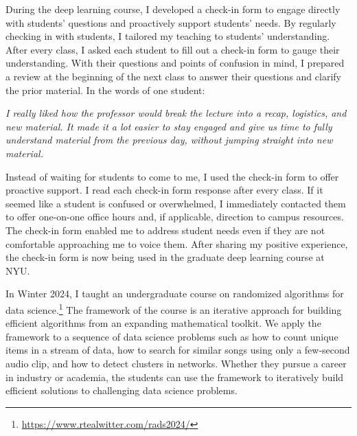 \documentclass[11pt]{article}
\begin{document}
During the deep learning course, I developed a check-in form to engage directly with students' questions and proactively support students' needs.
By regularly checking in with students, I tailored my teaching to students' understanding.
After every class, I asked each student to fill out a check-in form to gauge their understanding.
With their questions and points of confusion in mind, I prepared a review at the beginning of the next class to answer their questions and clarify the prior material.
In the words of one student:
\begin{displayquote}
\textit{
I really liked how the professor would break the lecture into a recap, logistics, and new material. It made it a lot easier to stay engaged and give us time to fully understand material from the previous day, without jumping straight into new material.
}
\end{displayquote}

Instead of waiting for students to come to me, I used the check-in form to offer proactive support.
I read each check-in form response after every class.
If it seemed like a student is confused or overwhelmed, I immediately contacted them to offer one-on-one office hours and, if applicable, direction to campus resources.
The check-in form enabled me to address student needs even if they are not comfortable approaching me to voice them.
After sharing my positive experience, the check-in form is now being used in the graduate deep learning course at NYU.


In Winter 2024, I taught an undergraduate course on randomized algorithms for data science.\footnote{\url{https://www.rtealwitter.com/rads2024/}}
The framework of the course is an iterative approach for building efficient algorithms from an expanding mathematical toolkit.
We apply the framework to a sequence of data science problems such as how to count unique items in a stream of data, how to search for similar songs using only a few-second audio clip, and how to detect clusters in networks.
Whether they pursue a career in industry or academia, the students can use the framework to iteratively build efficient solutions to challenging data science problems.
\end{document}

